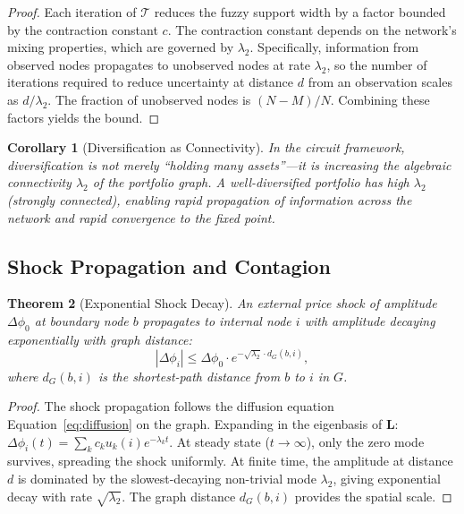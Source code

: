\documentclass[twocolumn,10pt]{article}
\newtheorem{theorem}{Theorem}[section]
\newtheorem{corollary}[theorem]{Corollary}
\theoremstyle{remark}
\newcommand{\Tcomp}{\mathcal{T}}
\newcommand{\eqnref}[1]{Equation~\ref{#1}}
\begin{document}
\begin{proof}
Each iteration of $\Tcomp$ reduces the fuzzy support width by a factor bounded by the contraction constant $c$.  The contraction constant depends on the network's mixing properties, which are governed by $\lambda_2$.  Specifically, information from observed nodes propagates to unobserved nodes at rate $\lambda_2$, so the number of iterations required to reduce uncertainty at distance $d$ from an observation scales as $d / \lambda_2$.  The fraction of unobserved nodes is $(N-M)/N$.  Combining these factors yields the bound.
\end{proof}

\begin{corollary}[Diversification as Connectivity]
\label{cor:diversification}
In the circuit framework, diversification is not merely ``holding many assets''---it is \emph{increasing the algebraic connectivity $\lambda_2$} of the portfolio graph.  A well-diversified portfolio has high $\lambda_2$ (strongly connected), enabling rapid propagation of information across the network and rapid convergence to the fixed point.
\end{corollary}

\subsection{Shock Propagation and Contagion}

\begin{theorem}[Exponential Shock Decay]
\label{thm:shock_decay}
An external price shock of amplitude $\Delta\phi_0$ at boundary node $b$ propagates to internal node $i$ with amplitude decaying exponentially with graph distance:
\begin{equation}
    |\Delta\phi_i| \leq \Delta\phi_0 \cdot e^{-\sqrt{\lambda_2} \cdot d_G(b, i)},
    \label{eq:shock_decay}
\end{equation}
where $d_G(b, i)$ is the shortest-path distance from $b$ to $i$ in $G$.
\end{theorem}

\begin{proof}
The shock propagation follows the diffusion equation \eqnref{eq:diffusion} on the graph.  Expanding in the eigenbasis of $\mathbf{L}$: $\Delta\phi_i(t) = \sum_k c_k u_k(i) e^{-\lambda_k t}$.  At steady state ($t \to \infty$), only the zero mode survives, spreading the shock uniformly.  At finite time, the amplitude at distance $d$ is dominated by the slowest-decaying non-trivial mode $\lambda_2$, giving exponential decay with rate $\sqrt{\lambda_2}$.  The graph distance $d_G(b,i)$ provides the spatial scale.
\end{proof}
\end{document}
